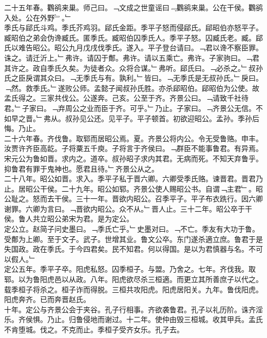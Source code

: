 \documentclass{zhvt-classic}
\begin{document}
\hspace*{2em}二十五年春。鸜鹆来巢。师己曰。﹁文成之世童谣曰﹃鸜鹆来巢。公在干侯。鸜鹆入处。公在外野﹄。﹂\\
\hspace*{2em}季氏与郈氏斗鸡。季氏芥鸡羽。郈氏金距。季平子怒而侵郈氏。郈昭伯亦怒平子。臧昭伯之弟会伪谗臧氏。匿季氏。臧昭伯囚季氏人。季平子怒。囚臧氏老。臧。郈氏以难告昭公。昭公九月戊戌伐季氏。遂入。平子登台请曰。﹁君以谗不察臣罪。诛之。请迁沂上。﹂弗许。请囚于鄪。弗许。请以五乘亡。弗许。子家驹曰。﹁君其许之。政自季氏久矣。为徒者众。众将合谋。﹂弗听。郈氏曰。﹁必杀之。﹂叔孙氏之臣戾谓其众曰。﹁无季氏与有。孰利。﹂皆曰。﹁无季氏是无叔孙氏。﹂戾曰。﹁然。救季氏。﹂遂败公师。孟懿子闻叔孙氏胜。亦杀郈昭伯。郈昭伯为公使。故孟氏得之。三家共伐公。公遂奔。己亥。公至于齐。齐景公曰。﹁请致千社待君。﹂子家曰。﹁弃周公之业而臣于齐。可乎。﹂乃止。子家曰。﹁齐景公无信。不如早之晋。﹂弗从。叔孙见公还。见平子。平子顿首。初欲迎昭公。孟孙。季孙后悔。乃止。\\
\hspace*{2em}二十六年春。齐伐鲁。取郓而居昭公焉。夏。齐景公将内公。令无受鲁赂。申丰。汝贾许齐臣高龁。子将粟五千庾。子将言于齐侯曰。﹁群臣不能事鲁君。有异焉。宋元公为鲁如晋。求内之。道卒。叔孙昭子求内其君。无病而死。不知天弃鲁乎。抑鲁君有罪于鬼神也。愿君且待。﹂齐景公从之。\\
\hspace*{2em}二十八年。昭公如晋。求入。季平子私于晋六卿。六卿受季氏赂。谏晋君。晋君乃止。居昭公干侯。二十九年。昭公如郓。齐景公使人赐昭公书。自谓﹁主君﹂。昭公耻之。怒而去干侯。三十一年。晋欲内昭公。召季平子。平子布衣跣行。因六卿谢罪。六卿为言曰。﹁晋欲内昭公。众不从。﹂晋人止。三十二年。昭公卒于干侯。鲁人共立昭公弟宋为君。是为定公。\\
\hspace*{2em}定公立。赵简子问史墨曰。﹁季氏亡乎。﹂史墨对曰。﹁不亡。季友有大功于鲁。受鄪为上卿。至于文子。武子。世增其业。鲁文公卒。东门遂杀適立庶。鲁君于是失国政。政在季氏。于今四君矣。民不知君。何以得国。是以为君慎器与名。不可以假人。﹂\\
\hspace*{2em}定公五年。季平子卒。阳虎私怒。囚季桓子。与盟。乃舍之。七年。齐伐我。取郓。以为鲁阳虎邑以从政。八年。阳虎欲尽杀三桓適。而更立其所善庶子以代之。载季桓子将杀之。桓子诈而得脱。三桓共攻阳虎。阳虎居阳关。九年。鲁伐阳虎。阳虎奔齐。已而奔晋赵氏。\\
\hspace*{2em}十年。定公与齐景公会于夹谷。孔子行相事。齐欲袭鲁君。孔子以礼历阶。诛齐淫乐。齐侯惧。乃止。归鲁侵地而谢过。十二年。使仲由毁三桓城。收其甲兵。孟氏不肯堕城。伐之。不克而止。季桓子受齐女乐。孔子去。\\
\end{document}

